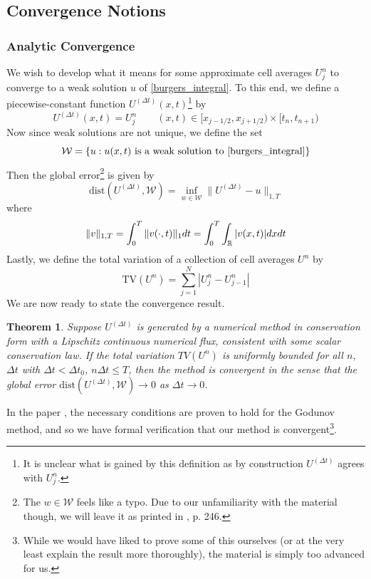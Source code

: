 \documentclass{myproject}
\newtheorem{theorem}{Theorem}
\begin{document}
\subsection{Convergence Notions}

\subsubsection{Analytic Convergence}
We wish to develop what it means for some approximate cell averages $U_j^n$ to converge to a weak solution $u$ of \eqref{burgers_integral}. To this end, we define a piecewise-constant function $U^{(\Delta t)}(x,t)$\footnote{It is unclear what is gained by this definition as by construction $U^{(\Delta t)}$ agrees with $U_j^n$.} by
\begin{equation}
    U^{(\Delta t)}(x,t) = U_j^n \qquad (x,t) \in [x_{j-1/2}, x_{j+1/2}) \times [t_n, t_{n+1})
\end{equation}
Now since weak solutions are not unique, we define the set
\begin{equation}
    \mathcal{W} = \{u : u(x,t) \text{ is a weak solution to \eqref{burgers_integral}}\}
\end{equation}
Then the global error\footnote{The $w \in \mathcal{W}$ feels like a typo. Due to our unfamiliarity with the material though, we will leave it as printed in \cite{leveque2002}, p. 246.} is given by
\begin{equation}
    \text{dist}\left(U^{(\Delta t)}, \mathcal{W}\right) = \inf_{w \in \mathcal{W}} \| U^{(\Delta t)} - u \|_{1,T}
\end{equation}
where 
\begin{equation}
    \|v\|_{1,T} = \int_{0}^{T} \|v(\cdot,t)\|_1dt = \int_{0}^{T}\int_{\operatorname{\mathbb{R}}}|v(x,t)|dx dt
\end{equation}
Lastly, we define the total variation of a collection of cell averages $U^n$ by 
\begin{equation}
    \text{TV}(U^n) = \sum_{j=1}^N |U_j^n - U_{j-1}^n|
\end{equation}
We are now ready to state the convergence result.
\begin{theorem}
    Suppose $U^{(\Delta t)}$ is generated by a numerical method in conservation form with a Lipschitz continuous numerical flux, consistent with some scalar conservation law. If the total variation $TV(U^n)$ is uniformly bounded for all $n$, $\Delta t$ with $\Delta t < \Delta t_0$, $n \Delta t \leq T$, then the method is convergent in the sense that the global error $\text{dist}\left(U^{(\Delta t)}, \mathcal{W}\right) \to 0$ as $\Delta t \to 0$.
\end{theorem}
In the paper \cite{leveque1985}, the necessary conditions are proven to hold for the Godunov method, and so we have formal verification that our method is convergent\footnote{While we would have liked to prove some of this ourselves (or at the very least explain the result more thoroughly), the material is simply too advanced for us.}. 
\end{document}
